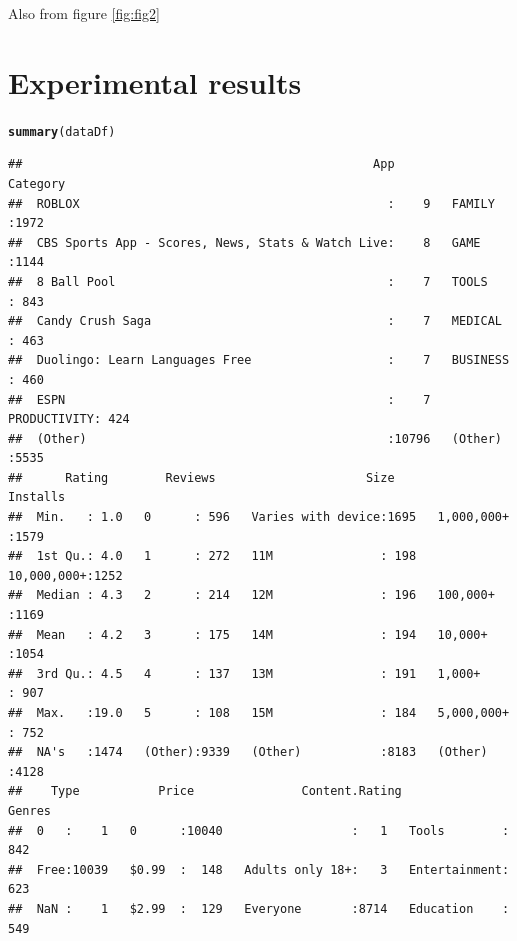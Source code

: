 \documentclass[12pt]{report}\usepackage[]{graphicx}\usepackage[]{xcolor}
\makeatletter
\newcommand{\hlstd}[1]{\textcolor[rgb]{0.345,0.345,0.345}{#1}}%
\newcommand{\hlkwd}[1]{\textcolor[rgb]{0.737,0.353,0.396}{\textbf{#1}}}%
\newenvironment{kframe}{%
 \def\at@end@of@kframe{}%
 \ifinner\ifhmode%
  \def\at@end@of@kframe{\end{minipage}}%
  \begin{minipage}{\columnwidth}%
 \fi\fi%
 \def\FrameCommand##1{\hskip\@totalleftmargin \hskip-\fboxsep
 \colorbox{shadecolor}{##1}\hskip-\fboxsep
     \hskip-\linewidth \hskip-\@totalleftmargin \hskip\columnwidth}%
 \MakeFramed {\advance\hsize-\width
   \@totalleftmargin\z@ \linewidth\hsize
   \@setminipage}}%
 {\par\unskip\endMakeFramed%
 \at@end@of@kframe}
\newenvironment{knitrout}{}{} %
\makeatother
\begin{document}
Also from figure \ref{fig:fig2}

    \chapter*{Experimental results}\label{ch:sec2}

    

\begin{knitrout}
\color{fgcolor}\begin{kframe}
\begin{alltt}
  \hlkwd{summary}\hlstd{(dataDf)}
\end{alltt}
\begin{verbatim}
##                                                 App                Category   
##  ROBLOX                                           :    9   FAMILY      :1972  
##  CBS Sports App - Scores, News, Stats & Watch Live:    8   GAME        :1144  
##  8 Ball Pool                                      :    7   TOOLS       : 843  
##  Candy Crush Saga                                 :    7   MEDICAL     : 463  
##  Duolingo: Learn Languages Free                   :    7   BUSINESS    : 460  
##  ESPN                                             :    7   PRODUCTIVITY: 424  
##  (Other)                                          :10796   (Other)     :5535  
##      Rating        Reviews                     Size             Installs   
##  Min.   : 1.0   0      : 596   Varies with device:1695   1,000,000+ :1579  
##  1st Qu.: 4.0   1      : 272   11M               : 198   10,000,000+:1252  
##  Median : 4.3   2      : 214   12M               : 196   100,000+   :1169  
##  Mean   : 4.2   3      : 175   14M               : 194   10,000+    :1054  
##  3rd Qu.: 4.5   4      : 137   13M               : 191   1,000+     : 907  
##  Max.   :19.0   5      : 108   15M               : 184   5,000,000+ : 752  
##  NA's   :1474   (Other):9339   (Other)           :8183   (Other)    :4128  
##    Type           Price               Content.Rating           Genres    
##  0   :    1   0      :10040                  :   1   Tools        : 842  
##  Free:10039   $0.99  :  148   Adults only 18+:   3   Entertainment: 623  
##  NaN :    1   $2.99  :  129   Everyone       :8714   Education    : 549  

\end{verbatim}
\end{kframe}
\end{knitrout}
\end{document}
